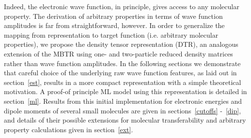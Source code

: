 Indeed, the electronic wave function, in principle, gives access to any molecular property. The derivation of arbitrary properties in terms of wave function amplitudes is far from straightforward, however. 
In order to generalize the mapping from representation to target function (i.e. arbitrary molecular properties), we propose the density tensor representation (DTR), an analogous extension of the MBTR using one- and two-particle reduced density matrices rather than wave function amplitudes. 
In the following sections we demonstrate that careful choice of the underlying raw wave function features, as laid out in section~\ref{est}, results in a more compact representation with a simple theoretical motivation. 
A proof-of principle ML model using this representation is detailed in section~\ref{ml}. 
Results from this initial implementation for electronic energies and dipole moments of several small molecules are given in sections~\ref{cutoffs} -~\ref{dip}, and details of their possible extensions for molecular transferability and arbitrary property calculations given in section~\ref{ext}.
